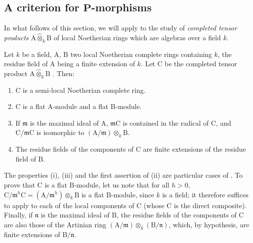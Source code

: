 \subsection{A criterion for \texorpdfstring{$\boldsymbol{P}$}{P}-morphisms}
\label{subsection:IV.7.5}


In what follows of this section, we will apply  to the study of \emph{completed tensor products} $\mathrm{A}\widehat{\otimes}_k\mathrm{B}$ of local Noetherian rings which are algebras over a field $k$.

\begin{lemma}[7.5.5]
\label{IV.7.5.5}
Let $k$ be a field, $\mathrm{A}$, $\mathrm{B}$ two local Noetherian complete rings containing $k$, the residue field of $\mathrm{A}$ being a finite extension of $k$. Let $\mathrm{C}$ be the completed tensor product $\mathrm{A}\widehat{\otimes}_k\mathrm{B}$ . Then:
\begin{enumerate}[label=(\roman*)]
  \item $\mathrm{C}$ is a semi-local Noetherian complete ring.
  \item $\mathrm{C}$ is a flat $\mathrm{A}$-module and a flat $\mathrm{B}$-module.
  \item If $\mathfrak{m}$ is the maximal ideal of $\mathrm{A}$, $\mathfrak{m}\mathrm{C}$ is contained in the radical of $\mathrm{C}$, and $\mathrm{C}/\mathfrak{m}\mathrm{C}$ is isomorphic to $(\mathrm{A}/\mathfrak{m})\otimes_k\mathrm{B}$.
  \item The residue fields of the components of $\mathrm{C}$ are finite extensions of the residue field of $\mathrm{B}$.
\end{enumerate}
The properties (i), (iii) and the first assertion of (ii) are particular cases of . To prove that $\mathrm{C}$ is a flat $\mathrm{B}$-module, let us note that for all $h>0$, $\mathrm{C}/\mathfrak{m}^h\mathrm{C}=(\mathrm{A}/\mathfrak{m}^h)\otimes_k\mathrm{B}$ is a flat $\mathrm{B}$-module, since $k$ is a field; it therefore suffices to apply  to each of the local components of $\mathrm{C}$ (whose $\mathrm{C}$ is the direct composite). Finally, if $\mathfrak{n}$ is the maximal ideal of $\mathrm{B}$, the residue fields of the components of $\mathrm{C}$ are also those of the Artinian ring $(\mathrm{A}/\mathfrak{m})\otimes_k(\mathrm{B}/\mathfrak{n})$, which, by hypothesis, are finite extensions of $\mathrm{B}/\mathfrak{n}$.
\end{lemma}

